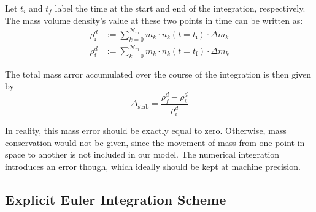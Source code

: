         Let $t_i$ and $t_f$ label the time at the start and end of the integration, respectively.
        The mass volume density's value at these two points in time can be written as:
        \begin{align}
            \rho_\text{i}^d
                &:=\sum_{k=0}^{\mathcal N_m} m_k\cdot n_k(t=t_\text{i})\cdot\Delta m_k
            \\
            \rho_\text{f}^d
                &:=\sum_{k=0}^{\mathcal N_m} m_k\cdot n_k(t=t_\text{f})\cdot\Delta m_k
        \end{align}

        The total mass arror accumulated over the course of the integration is then given by
        \begin{equation}
            \label{eq:definition_of_integration_mass_error_stability}
            \Delta_\text{stab} =\frac{\rho_f^d - \rho_i^d}{\rho_i^d}
        \end{equation}



        In reality, this mass error should be exactly equal to zero. Otherwise, mass conservation would not be given, since the movement of mass from one point in space to another is not included in our model. 
        The numerical integration introduces an error though, which ideally should be kept at machine precision. %

    \subsection{Explicit Euler Integration Scheme}
    \label{sec:explicit_euler}

